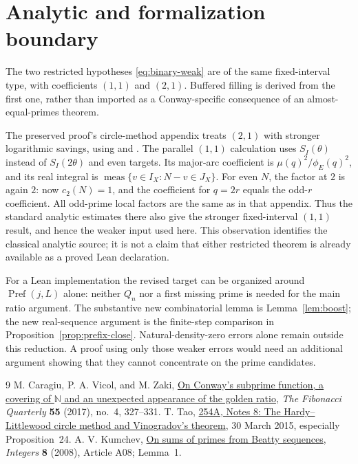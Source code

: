 \documentclass[11pt,letterpaper]{article}
\numberwithin{equation}{section}
\theoremstyle{remark}
\DeclareMathOperator{\meas}{meas}
\newcommand{\N}{\mathbb N}
\newcommand{\tot}{\phi_{\!E}}
\begin{document}
\section{Analytic and formalization boundary}

The two restricted hypotheses \eqref{eq:binary-weak} are of the same
fixed-interval type, with coefficients $(1,1)$ and $(2,1)$. Buffered
filling is derived from the first one, rather than imported as a
Conway-specific consequence of an almost-equal-primes theorem.

The preserved proof's circle-method appendix treats $(2,1)$ with stronger
logarithmic savings, using \cite[Proposition~24]{Tao} and
\cite[Lemma~1]{Kumchev}. The parallel $(1,1)$ calculation uses $S_I(\theta)$
instead of $S_I(2\theta)$ and even targets. Its major-arc coefficient is
$\mu(q)^2/\tot(q)^2$, and its real integral is
$\meas\{v\in I_X:N-v\in J_X\}$. For even $N$, the factor at $2$
is again $2$: now $c_2(N)=1$, and the coefficient for $q=2r$ equals
the odd-$r$ coefficient. All odd-prime local factors are the same as
in that appendix. Thus the standard analytic estimates there also give
the stronger fixed-interval $(1,1)$ result, and hence the weaker input
used here. This observation identifies the classical analytic source;
it is not a claim that either restricted theorem is already available
as a proved Lean declaration.

For a Lean implementation the revised target can be organized around
$\operatorname{Pref}(j,L)$ alone: neither $Q_n$ nor a first missing prime
is needed for the main ratio argument. The substantive new combinatorial
lemma is Lemma~\ref{lem:boost}; the new real-sequence argument is the
finite-step comparison in Proposition~\ref{prop:prefix-close}.
Natural-density-zero errors alone remain outside this reduction.
A proof using only those weaker errors would need an additional argument
showing that they cannot concentrate on the prime candidates.

\begin{thebibliography}{9}
M. Caragiu, P. A. Vicol, and M. Zaki,
\href{https://www.fq.math.ca/Papers1/55-4/CaragiuVicolZaki03162017.pdf}
{On Conway's subprime function, a covering of $\N$ and an unexpected
appearance of the golden ratio},
\emph{The Fibonacci Quarterly} \textbf{55} (2017), no.~4, 327--331.
T. Tao,
\href{https://terrytao.wordpress.com/2015/03/30/254a-notes-8-the-hardy-littlewood-circle-method-and-vinogradovs-theorem/}
{254A, Notes 8: The Hardy--Littlewood circle method and Vinogradov's theorem},
30 March 2015, especially Proposition~24.
A. V. Kumchev,
\href{https://tigerweb.towson.edu/akumchev/a23.pdf}
{On sums of primes from Beatty sequences},
\emph{Integers} \textbf{8} (2008), Article A08; Lemma~1.
\end{thebibliography}
\end{document}
